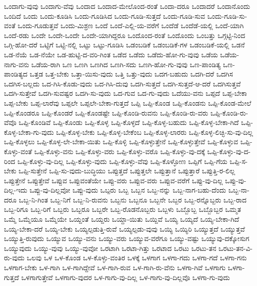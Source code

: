 {ಒಂದಾಗು-ವುವು
ಒಂದಾಗು-ವೆವು
ಒಂದಾದ
ಒಂದಾದ-ಮೇಲೊಂದ-ರಂತೆ
ಒಂದಾ-ದರೂ
ಒಂದಾದರೆ
ಒಂದಾನೊಂದು
ಒಂದಿದೆ
ಒಂದು
ಒಂದು-ಕೂಡಿಸಿ
ಒಂದು-ಗೂಡಿಸಿದ
ಒಂದು-ಗೂಡಿ-ಸುತ್ತದೆ
ಒಂದು-ಗೂಡಿ-ಸುವ
ಒಂದು-ಗೂಡಿ-ಸು-ವಂತೆ
ಒಂದು-ಗೂಡುತ್ತವೆ
ಒಂದು-ಮಿಶ್ರಣ
ಒಂದೆ
ಒಂದೆ-ಎಲ್ಲಿ-ಯ-ವರೆಗೆ
ಒಂದೆಡೆ
ಒಂದೆಡೆ-ಯಲ್ಲಿ
ಒಂದೆ-ಯಾಗಿ
ಒಂದೆ-ರಡು
ಒಂದೇ
ಒಂದೇ-ಒಂದೇ
ಒಂದೇ-ಯಾಗಿದ್ದರೂ
ಒಂದೊಂದ-ರಂತೆ
ಒಂದೊಂದು
ಒಂಬತ್ತು
ಒಗ್ಗಟ್ಟಿ-ನಿಂದ
ಒಗ್ಗಿ-ಹೋ-ದರೆ
ಒಟ್ಟಿಗೆ
ಒಟ್ಟಿ-ನಲ್ಲಿ
ಒಟ್ಟು
ಒಟ್ಟು-ಗೂಡಿಸಿ
ಒಡಂಬಡಿಕೆ
ಒಡಂಬಡಿಕೆ-ಗಳ
ಒಡಂಬಡಿಕೆ-ಯಲ್ಲಿ
ಒಡನೆ
ಒಡ-ನೆಯೆ
ಒಡ-ನೆಯೇ
ಒಡ-ಹುಟ್ಟಿ-ದ-ವರಿ-ಗಿಂತ
ಒಡೆದ
ಒಡೆದು
ಒಡೆದು-ಹೋ-ಗು-ವುವು
ಒಡೆಯ
ಒಡೆಯ-ನಾಗು-ವನು
ಒಡೆಯ-ರಾಗಿ
ಒಣ
ಒಣಗಿ
ಒಣಗಿದ
ಒಣಗಿ-ಸದು
ಒಣಗಿ-ಹೋ-ಗು-ವುವು
ಒಣ-ಪಾಂಡಿತ್ಯ
ಒಣ-ಪಾಂಡಿತ್ಯದ
ಒತ್ತಡ
ಒತ್ತ-ಬೇಕು
ಒತ್ತಾ-ಯಿಸು-ವುದು
ಒತ್ತಿ
ಒತ್ತು-ವುದು
ಒದಗ-ಬಹುದು
ಒದಗಿ-ದರೆ
ಒದಗಿಸ
ಒದಗಿಸ-ಬಲ್ಲದು
ಒದ-ಗಿಸಿ-ಕೊಡು-ವುದು
ಒದ-ಗಿಸಿ-ದುವು
ಒದಗಿ-ಸುತ್ತದೆ
ಒದಗಿ-ಸುತ್ತದೆ-ಆ-ದರೆ
ಒದಗಿಸುತ್ತವೆ
ಒದಗಿ-ಸುತ್ತೇವೆ
ಒದಗಿ-ಸುವಷ್ಟರ
ಒದಗಿ-ಸು-ವುದು
ಒದ-ಗುವ
ಒದ-ಗು-ವುದು
ಒದೆಯು-ವನು
ಒಪ್ಪದೆ
ಒಪ್ಪ-ಬೇಕಾ
ಒಪ್ಪ-ಬೇಕು
ಒಪ್ಪ-ಲಾರೆವು
ಒಪ್ಪಲೇ
ಒಪ್ಪಲೇ-ಬೇಕಾ-ಗುತ್ತದೆ
ಒಪ್ಪಿ
ಒಪ್ಪಿ-ಕೊಂಡ
ಒಪ್ಪಿ-ಕೊಂಡನು
ಒಪ್ಪಿ-ಕೊಂಡ-ಮೇಲೆ
ಒಪ್ಪಿ-ಕೊಂಡರೂ
ಒಪ್ಪಿ-ಕೊಂಡರೆ
ಒಪ್ಪಿ-ಕೊಂಡಷ್ಟೇ
ಒಪ್ಪಿ-ಕೊಂಡಿ-ರುವನು
ಒಪ್ಪಿ-ಕೊಂಡಿ-ರು-ವರು
ಒಪ್ಪಿ-ಕೊಂಡಿ-ರು-ವೆವೊ
ಒಪ್ಪಿ-ಕೊಂಡಿವೆ
ಒಪ್ಪಿ-ಕೊಂಡು
ಒಪ್ಪಿ-ಕೊಳ್ಳ
ಒಪ್ಪಿ-ಕೊಳ್ಳದೆ
ಒಪ್ಪಿ-ಕೊಳ್ಳ-ಬಹುದು
ಒಪ್ಪಿ-ಕೊಳ್ಳ-ಬೇಕಾ-ಗಿದೆ
ಒಪ್ಪಿ-ಕೊಳ್ಳ-ಬೇಕಾ-ಗು-ವುದು
ಒಪ್ಪಿ-ಕೊಳ್ಳ-ಬೇಕು
ಒಪ್ಪಿ-ಕೊಳ್ಳ-ಬೇಕೆಂಬ
ಒಪ್ಪಿ-ಕೊಳ್ಳ-ಲಾರರು
ಒಪ್ಪಿ-ಕೊಳ್ಳ-ಲಿಚ್ಛಿ-ಸು-ವು-ದಿಲ್ಲ
ಒಪ್ಪಿ-ಕೊಳ್ಳಲು
ಒಪ್ಪಿ-ಕೊಳ್ಳ-ಲೇ-ಬೇಕಾ-ಯಿತು
ಒಪ್ಪಿ-ಕೊಳ್ಳಿ
ಒಪ್ಪಿ-ಕೊಳ್ಳುತ್ತೇನೆ
ಒಪ್ಪಿ-ಕೊಳ್ಳುತ್ತೇವೆ
ಒಪ್ಪಿ-ಕೊಳ್ಳುವ
ಒಪ್ಪಿ-ಕೊಳ್ಳು-ವಂತೆ
ಒಪ್ಪಿ-ಕೊಳ್ಳು-ವನು
ಒಪ್ಪಿ-ಕೊಳ್ಳು-ವರು
ಒಪ್ಪಿ-ಕೊಳ್ಳು-ವರೊ
ಒಪ್ಪಿ-ಕೊಳ್ಳು-ವು-ದಕ್ಕೆ
ಒಪ್ಪಿ-ಕೊಳ್ಳು-ವು-ದ-ರಿಂದ
ಒಪ್ಪಿ-ಕೊಳ್ಳು-ವು-ದಿಲ್ಲ
ಒಪ್ಪಿ-ಕೊಳ್ಳು-ವುದು
ಒಪ್ಪಿ-ಕೊಳ್ಳು-ವೆವು
ಒಪ್ಪಿ-ಕೊಳ್ಳೋಣ
ಒಪ್ಪಿಗೆ
ಒಪ್ಪಿ-ಗೆಯ
ಒಪ್ಪಿ-ಸ-ಬೇಕು
ಒಪ್ಪಿ-ಸುತ್ತೇನೆ
ಒಪ್ಪಿ-ಸು-ವುದು-ಬುದ್ಧಿಯು
ಒಪ್ಪುತ್ತದೆ
ಒಪ್ಪುತ್ತಲೇ
ಒಪ್ಪುತ್ತಾನೆ
ಒಪ್ಪುತ್ತಾರೆ
ಒಪ್ಪುತ್ತಿ-ರ-ಲಿಲ್ಲ
ಒಪ್ಪುತ್ತೇನೆ
ಒಪ್ಪುತ್ತೇವೆ
ಒಪ್ಪುವ
ಒಪ್ಪುವಂತೆಯೇ
ಒಪ್ಪು-ವರು
ಒಪ್ಪುವ-ವರು
ಒಪ್ಪುವ-ವರೆಗೆ
ಒಪ್ಪು-ವು-ದಿಲ್ಲ
ಒಪ್ಪು-ವು-ದಿಲ್ಲ-ಇದು
ಒಪ್ಪು-ವು-ದಿಲ್ಲವೋ
ಒಪ್ಪು-ವುದು
ಒಬ್ಪರು
ಒಬ್ಬ
ಒಬ್ಬನ
ಒಬ್ಬ-ನನ್ನು
ಒಬ್ಬ-ನಾಗ-ಬಹು-ದೆಂದು
ಒಬ್ಬ-ನಾ-ದರೂ
ಒಬ್ಬ-ನಿ-ಗಿಂತ
ಒಬ್ಬ-ನಿಗೆ
ಒಬ್ಬ-ನಿ-ರುವನು
ಒಬ್ಬನು
ಒಬ್ಬನೂ
ಒಬ್ಬನೇ
ಒಬ್ಬರ
ಒಬ್ಬ-ರನ್ನೊಬ್ಬರು
ಒಬ್ಬ-ರಾದ
ಒಬ್ಬ-ರಿಗೂ
ಒಬ್ಬ-ರಿಗೆ
ಒಬ್ಬರು
ಒಬ್ಬರೂ
ಒಬ್ಬರೇ
ಒಬ್ಬ-ರೊಡನೊಬ್ಬರು
ಒಬ್ಬಳು
ಒಬ್ಬೊಬ್ಬ
ಒಬ್ಬೊಬ್ಬರ
ಒಮ್ಮತ
ಒಮ್ಮೆ
ಒಮ್ಮೆಯೂ
ಒಮ್ಮೆಯೇ
ಒಯ್ದಂತೆ
ಒಯ್ದರು
ಒಯ್ದಾ-ಯಿತು
ಒಯ್ದಿವೆ
ಒಯ್ಯ
ಒಯ್ಯದೆ
ಒಯ್ಯ-ಬೇಕಾ-ಗಿದೆ
ಒಯ್ಯ-ಬೇಕಾ-ದರೆ
ಒಯ್ಯ-ಬೇಕು
ಒಯ್ಯಲ್ಪಡುತ್ತಿ-ರುವೆ
ಒಯ್ಯಲ್ಪಡು-ವುವು
ಒಯ್ಯಿ
ಒಯ್ಯಿರಿ
ಒಯ್ಯುತ್ತದೆ
ಒಯ್ಯುತ್ತವೆ
ಒಯ್ಯುತ್ತಿ-ರುವುದು
ಒಯ್ಯುವ
ಒಯ್ಯು-ವನು
ಒಯ್ಯು-ವರು
ಒಯ್ಯುವ-ವರೆಗೂ
ಒಯ್ಯು-ವಷ್ಟು
ಒಯ್ಯುವು-ದಕ್ಕೋಸುಗ
ಒಯ್ಯುವುದು
ಒಯ್ಯು-ವುವು
ಒಯ್ಯು-ವುವೋ
ಒರಟಾಗಿ
ಒರಟಾ-ಗಿತ್ತು
ಒರಟಾದ
ಒರಟು
ಒರಟು-ತನ
ಒರಟು-ತನ-ವಿ-ರು-ವುದು
ಒಲವು
ಒಳ
ಒಳ-ಕೊಂಡ
ಒಳ-ಕೊಳ್ಳು-ವಂತಿರ
ಒಳಕ್ಕೆ
ಒಳಗಾಗ
ಒಳಗಾ-ಗದು
ಒಳಗಾ-ಗದೆ
ಒಳಗಾ-ಗನು
ಒಳಗಾಗ-ಬೇಕು
ಒಳ-ಗಾಗಿ
ಒಳ-ಗಾಗಿದ್ದೇವೆ
ಒಳ-ಗಾಗಿ-ರುವ
ಒಳ-ಗಾಗಿ-ರು-ವೆನು
ಒಳಗಾ-ಗಿವೆ
ಒಳಗಾಗು
ಒಳಗಾ-ಗುತ್ತದೆ
ಒಳಗಾಗುತ್ತೇವೆ
ಒಳಗಾಗು-ವುದರ
ಒಳ-ಗಾಗು-ವು-ದಿಲ್ಲ
ಒಳ-ಗಾಗು-ವು-ದಿಲ್ಲವೊ
ಒಳಗಾ-ಗು-ವುದು
}
